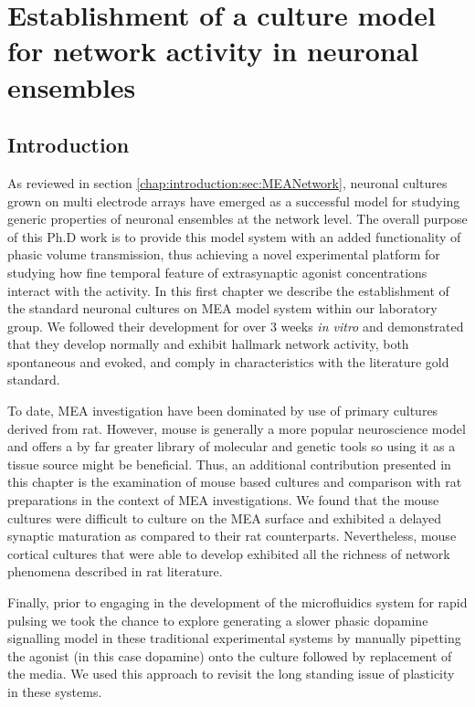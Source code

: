 \chapter{Establishment of a culture model for network activity in neuronal ensembles}
\label{chap:activity}
    \section{Introduction}
      As reviewed in section \ref{chap:introduction:sec:MEANetwork}, neuronal cultures grown on multi electrode arrays have emerged as a successful model for studying generic properties of neuronal ensembles at the network level. The overall purpose of this Ph.D work is to provide this model system with an added functionality of phasic volume transmission, thus achieving a novel experimental platform for studying how fine temporal feature of extrasynaptic agonist concentrations interact with the activity. In this first chapter we describe the establishment of the standard neuronal cultures on MEA model system within our laboratory group. We followed their development for over 3 weeks \textit{in vitro} and demonstrated that they develop normally and exhibit hallmark network activity, both spontaneous and evoked, and comply in characteristics with the literature gold standard.

        To date, MEA investigation have been dominated by use of primary cultures derived from rat. However, mouse is generally a more popular neuroscience model and offers a by far greater library of molecular and genetic tools so using it as a tissue source might be beneficial. Thus, an additional contribution presented in this chapter is the examination of mouse based cultures and comparison with rat preparations in the context of MEA investigations. We found that the mouse cultures were difficult to culture on the MEA surface and exhibited a delayed synaptic maturation as compared to their rat counterparts. Nevertheless, mouse cortical cultures that were able to develop exhibited all the richness of network phenomena described in rat literature.

        Finally, prior to engaging in the development of the microfluidics system for rapid pulsing we took the chance to explore generating a slower phasic dopamine signalling model in these traditional experimental systems by manually pipetting the agonist (in this case dopamine) onto the culture followed by replacement of the media. We used this approach to revisit the long standing issue of plasticity in these systems.

